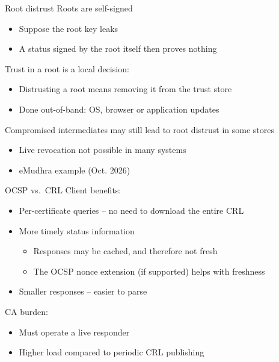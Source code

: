 \begin{frame}{Root distrust}
  Roots are self-signed
  \begin{itemize}[<+(1)->]
    \item Suppose the root key leaks
    \item A status signed by the root itself then proves nothing
  \end{itemize}

  \vspace*{0.5em}

  \pause
  Trust in a root is a local decision:
  \begin{itemize}[<+(1)->]
    \item Distrusting a root means removing it from the trust store
    \item Done out-of-band: OS, browser or application updates
  \end{itemize}

  \vspace*{0.5em}

  \pause
  Compromised intermediates may still lead to root distrust in some stores
  \begin{itemize}
    \item Live revocation not possible in many systems
    \item eMudhra example (Oct. 2026)
  \end{itemize}
\end{frame}

\begin{frame}{OCSP vs.\ CRL}
  Client benefits:
  \begin{itemize}[<+(1)->]
    \item Per-certificate queries -- no need to download the entire CRL
    \item More timely status information
    \begin{itemize}
      \item Responses may be cached, and therefore not fresh
      \item The OCSP nonce extension (if supported) helps with freshness
    \end{itemize}
    \item Smaller responses -- easier to parse
  \end{itemize}

  \vspace*{0.5em}

  \pause
  CA burden:
  \begin{itemize}[<+(1)->]
    \item Must operate a live responder
    \item Higher load compared to periodic CRL publishing
  \end{itemize}
\end{frame}


